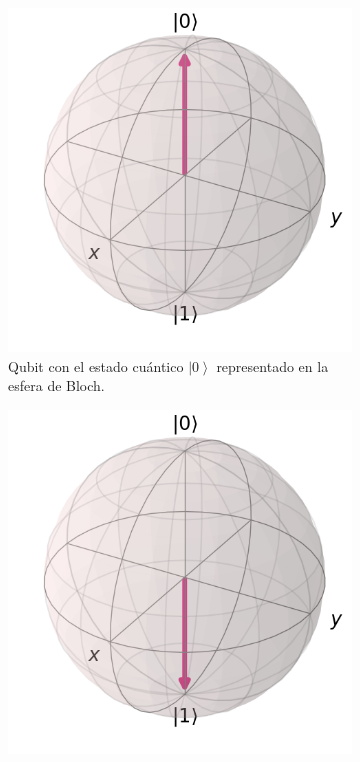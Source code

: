 \begin{figure}[H]
    \begin{subfigure}{0.5\linewidth}
        \centering
        \includegraphics[scale=0.3]{images/0.png}
        \caption{Qubit con el estado cuántico $\left|0 \right\rangle$ representado en la esfera de Bloch.}
    \end{subfigure}
    \begin{subfigure}{0.5\linewidth}
        \centering
        \includegraphics[scale=0.3]{images/1.png}

\end{subfigure}
\end{figure}
